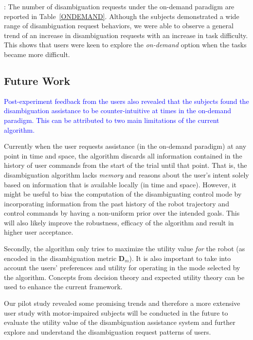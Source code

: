\documentclass[conference]{IEEEtran}
\begin{document}
\vspace{0.1cm}
: The number of disambiguation requests under the on-demand paradigm are reported in Table~\ref{ONDEMAND}. Although the subjects demonstrated a wide range of disambiguation request behaviors, we were able to observe a general trend of an increase in disambiguation requests with an increase in task difficulty. This shows that users were keen to explore the \textit{on-demand} option when the tasks became more difficult. 

\subsection{Future Work}
\textcolor{blue}{Post-experiment feedback from the users also revealed that the subjects found the disambiguation assistance to be counter-intuitive at times in the on-demand paradigm. This can be attributed to two main limitations of the current algorithm.} 

Currently when the user requests assistance (in the on-demand paradigm) at any point in time and space, the algorithm discards all information contained in the history of user commands from the start of the trial until that point. That is, the disambiguation algorithm lacks \textit{memory} and reasons about the user's intent solely based on information that is available locally (in time and space). However, it might be useful to bias the computation of the disambiguating control mode by incorporating information from the past history of the robot trajectory and control commands by having a non-uniform prior over the intended goals. This will also likely improve the robustness, efficacy of the algorithm and result in higher user acceptance.

Secondly, the algorithm only tries to maximize the utility value \textit{for} the robot (as encoded in the disambiguation metric $\boldsymbol{D}_m$). It is also important to take into account the users' preferences and utility for operating in the mode selected by the algorithm. Concepts from decision theory and expected utility theory can be used to enhance the current framework. 

Our pilot study revealed some promising trends and therefore a more extensive user study with motor-impaired subjects will be conducted in the future to evaluate the utility value of the disambiguation assistance system and further explore and understand the disambiguation request patterns of users.
\end{document}
